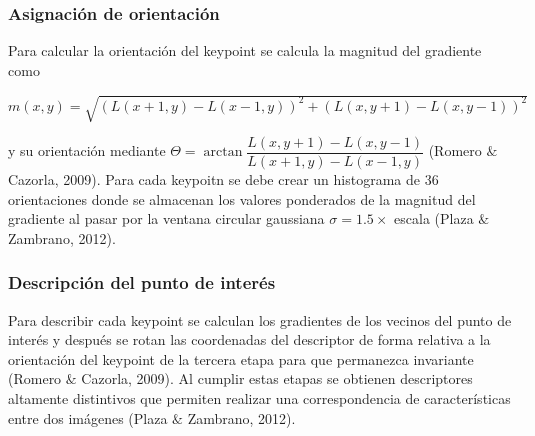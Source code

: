 \documentclass[letterpaper]{article}
\begin{document}
\subsubsection{Asignación de orientación}
Para calcular la orientación del keypoint se calcula la magnitud del gradiente como\\
\begin{center}
$ m(x,y) = \sqrt{(L(x+1,y)-L(x-1,y))^{2}+(L(x,y+1)-L(x,y-1))^{2}}$
\end{center} y su orientación mediante $\Theta = \arctan \dfrac{L(x,y+1)-L(x,y-1)}{L(x+1,y)-L(x-1,y)}$ (Romero $\&$ Cazorla, 2009). Para cada keypoitn se debe crear un histograma de 36 orientaciones donde se almacenan los valores ponderados de la magnitud del gradiente al pasar por la ventana circular gaussiana $\sigma = 1.5 \times$ escala (Plaza $\&$ Zambrano, 2012).
\subsubsection{Descripción del punto de interés}
Para describir cada keypoint se calculan los gradientes de los vecinos del punto de interés y después se rotan las coordenadas del descriptor de forma relativa a la orientación del keypoint de la tercera etapa para que permanezca invariante (Romero $\&$ Cazorla, 2009).
Al cumplir estas etapas se obtienen descriptores altamente distintivos que permiten realizar una correspondencia de características entre dos imágenes (Plaza $\&$ Zambrano, 2012).\\\\
\end{document}
